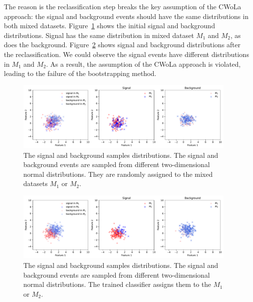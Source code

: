 \documentclass[12pt]{article}
\begin{document}
    The reason is the reclassification step breaks the key assumption of the CWoLa approach: the signal and background events should have the same distributions in both mixed datasets. Figure~\ref{fig:bootstrapping_signal_background_distribution_origin} shows the initial signal and background distributions. Signal has the same distribution in mixed dataset $M_1$ and $M_2$, as does the background. Figure~\ref{fig:bootstrapping_signal_background_distribution_iteration_1} shows signal and background distributions after the reclassification. We could observe the signal events have different distributions in $M_1$ and $M_2$. As a result, the assumption of the CWoLa approach is violated, leading to the failure of the bootstrapping method.
    \begin{figure}[htpb]
        \centering
        \includegraphics[width=0.97\textwidth]{bootstrapping_training_data_original.pdf}
        \caption{The signal and background samples distributions. The signal and background events are sampled from different two-dimensional normal distributions. They are randomly assigned to the mixed datasets $M_1$ or $M_2$.}
        \label{fig:bootstrapping_signal_background_distribution_origin}
    \end{figure}
    \begin{figure}[htpb]
        \centering
        \includegraphics[width=0.97\textwidth]{bootstrapping_training_data_iteration_1.pdf}
        \caption{The signal and background samples distributions. The signal and background events are sampled from different two-dimensional normal distributions. The trained classifier assigns them to the $M_1$ or $M_2$.}
        \label{fig:bootstrapping_signal_background_distribution_iteration_1}
    \end{figure}
\end{document}
